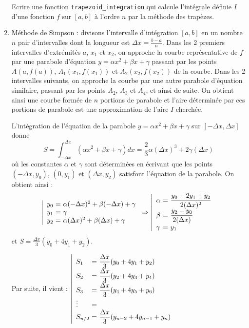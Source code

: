 \begin{td}
\begin{enumerate}
	Ecrire une fonction {\tt trapezoid\_integration} qui calcule l'intégrale définie $I$ d'une fonction 
	$f$ sur $[a,b]$ à l'ordre $n$ par la méthode des trapèzes.
	
\item Méthode de Simpson : divisons l'intervalle d'intégration $[a,b]$ en un nombre 
	$n$ pair d'inter\-val\-les dont la longueur est 
	$\displaystyle\Delta x = \frac{b-a}{n}$. 
	Dans les 2 premiers intervalles d'extrémités $a$, $x_1$ et $x_2$, on approche 
	la courbe représentative de $f$ par une parabole d'équation 
	$y = \alpha x^2 + \beta x + \gamma$ passant par les points $A(a,f(a))$, 
	$A_1(x_1,f(x_1))$ et $A_2(x_2,f(x_2))$ de la courbe. Dans les 2 intervalles 
	suivants, on approche la courbe par une autre parabole d'équation similaire, 
	passant par les points $A_2$, $A_3$ et $A_4$, et ainsi de suite.
	On obtient ainsi une courbe formée de $n$ portions de parabole et
	l'aire déterminée par ces portions de parabole est une approximation de l'aire $I$
	cherchée.
	
	L'intégration de l'équation de la parabole $y = \alpha x^2 + \beta x + \gamma$ sur
	$\displaystyle \left[-\Delta x,\Delta x\right]$ donne 
	$$S = \int_{-\Delta x}^{\Delta x} (\alpha x^2 + \beta x + \gamma)dx = 
	\frac{2}{3}\alpha(\Delta x)^3 + 2\gamma(\Delta x)$$
	où les constantes $\alpha$ et $\gamma$ sont déterminées en écrivant que les points
	$(-\Delta x,y_0)$, $(0,y_1)$ et $(\Delta x,y_2)$ satisfont l'équation de la parabole.
	On obtient ainsi :
	$$\left|\begin{array}{l@{\ =\ }l}
	y_0 & \alpha(-\Delta x)^2 + \beta(-\Delta x) + \gamma\\
	y_1 & \gamma\\
	y_2 & \alpha(\Delta x)^2 + \beta(\Delta x) + \gamma
	\end{array}\right.
	\Rightarrow
	\left|\begin{array}{l@{\ =\ }l}
	\alpha & \displaystyle \frac{y_0 - 2y_1 + y_2}{2(\Delta x)^2} \\
	\beta  & \displaystyle \frac{y_2-y_0}{2(\Delta x)}\\
	\gamma & \displaystyle y_1
	\end{array}\right.$$
	et $\displaystyle S = \frac{\Delta x}{3}(y_0+4y_1+y_2)$.
	
	Par suite, il vient :
	$\displaystyle\left|\begin{array}{l@{\ =\ }l}
	S_1     & \displaystyle \frac{\Delta x}{3}(y_0 + 4y_1 + y_2)\\
	S_2     & \displaystyle \frac{\Delta x}{3}(y_2 + 4y_3 + y_4)\\
	S_3     & \displaystyle \frac{\Delta x}{3}(y_4 + 4y_5 + y_6)\\
	\vdots  \\
	\displaystyle S_{n/2} & \displaystyle \frac{\Delta x}{3}(y_{n-2} + 4y_{n-1} + y_n)
	\end{array}\right.$ 
	

\end{enumerate}
\end{td}
